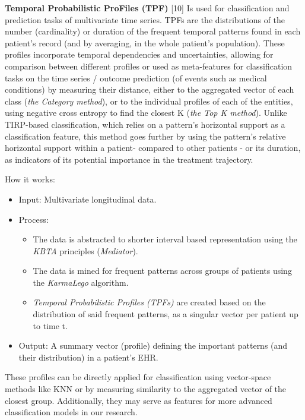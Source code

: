 \documentclass[
]{article}
\begin{document}
\textbf{Temporal Probabilistic ProFiles (TPF)} {[}10{]} Is used for
classification and prediction tasks of multivariate time series. TPFs
are the distributions of the number (cardinality) or duration of the
frequent temporal patterns found in each patient's record (and by
averaging, in the whole patient's population). These profiles
incorporate temporal dependencies and uncertainties, allowing for
comparison between different profiles or used as meta-features for
classification tasks on the time series / outcome prediction (of events
such as medical conditions) by measuring their distance, either to the
aggregated vector of each class (\emph{the Category method}), or to the
individual profiles of each of the entities, using negative cross
entropy to find the closest K (\emph{the Top K method}). Unlike
TIRP-based classification, which relies on a pattern's horizontal
support as a classification feature, this method goes further by using
the pattern's relative horizontal support within a patient- compared to
other patients - or its duration, as indicators of its potential
importance in the treatment trajectory.

How it works:

\begin{itemize}
\item
  Input: Multivariate longitudinal data.
\end{itemize}

\begin{itemize}
\item
  Process:

  \begin{itemize}
  \item
    The data is abstracted to shorter interval based representation
    using the \emph{KBTA} principles (\emph{Mediator}).
  \item
    The data is mined for frequent patterns across groups of patients
    using the \emph{KarmaLego} algorithm.
  \item
    \emph{Temporal Probabilistic Profiles (TPFs)} are created based on
    the distribution of said frequent patterns, as a singular vector per
    patient up to time t.
  \end{itemize}
\item
  Output: A summary vector (profile) defining the important patterns
  (and their distribution) in a patient's EHR.
\end{itemize}

These profiles can be directly applied for classification using
vector-space methods like KNN or by measuring similarity to the
aggregated vector of the closest group. Additionally, they may serve as
features for more advanced classification models in our research.
\end{document}
